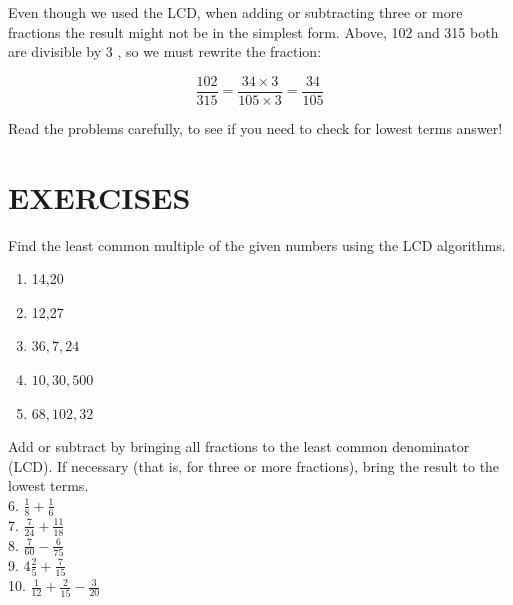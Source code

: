 \documentclass{ximera}
\begin{document}
Even though we used the LCD, when adding or subtracting three or more fractions the result might not be in the simplest form. Above, 102 and 315 both are divisible by 3 , so we must rewrite the fraction:

$$\frac{102}{315}=\frac{34 \times 3}{105 \times 3}=\frac{34}{105}$$

Read the problems carefully, to see if you need to check for lowest terms answer!

\section*{EXERCISES}
Find the least common multiple of the given numbers using the LCD algorithms.

\begin{enumerate}
  \item 14,20
  \item 12,27
  \item $36,7,24$
  \item $10,30,500$
  \item $68,102,32$
\end{enumerate}

Add or subtract by bringing all fractions to the least common denominator (LCD). If necessary (that is, for three or more fractions), bring the result to the lowest terms.\\
6. $\frac{1}{8}+\frac{1}{6}$\\
7. $\frac{7}{24}+\frac{11}{18}$\\
8. $\frac{7}{60}-\frac{6}{75}$\\
9. $4 \frac{2}{5}+\frac{7}{15}$\\
10. $\frac{1}{12}+\frac{2}{15}-\frac{3}{20}$
\end{document}
